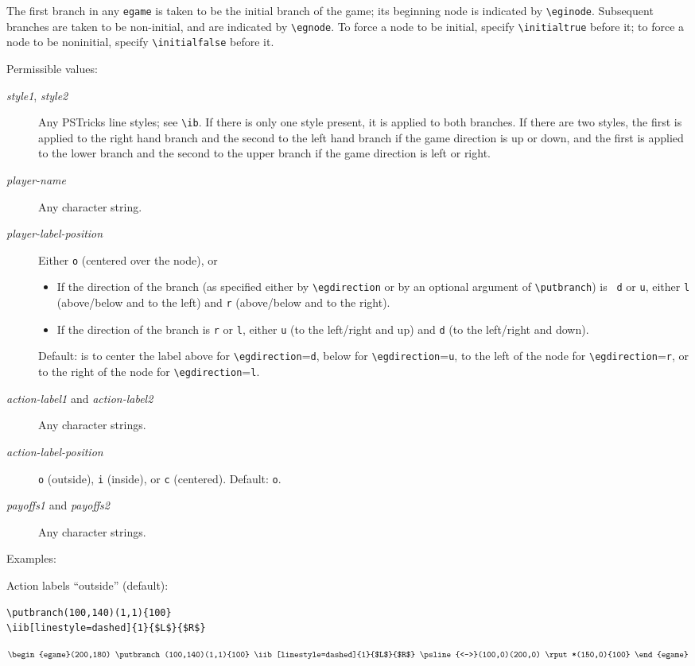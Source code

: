 \documentclass[12pt]{article}
\begin{document}
The first branch in any {\tt egame} is taken to be the initial branch of the
game; its beginning node is indicated by \verb+\eginode+.  Subsequent branches
are taken to be non-initial, and are indicated by \verb+\egnode+.  To force a
node to be initial, specify \verb+\initialtrue+ before it; to force a node to
be noninitial, specify \verb+\initialfalse+ before it.

Permissible values:
\begin{description}
\item[\emph{style1}, \emph{style2}] Any PSTricks line styles; see \verb+\ib+. 
If there is only one style present, it is applied to both branches.  If there
are two styles, the first is applied to the right hand branch and the second
to the left hand branch if the game direction is up or down, and the first is
applied to the lower branch and the second to the upper branch if the game
direction is left or right.
\item[\emph{player-name}] Any character string.
\item[\emph{player-label-position}] Either \verb+o+ (centered over the node),
or
\begin{itemize}
   \item If the direction of the branch (as specified either by
\verb+\egdirection+ or by an optional argument of \verb+\putbranch+) is {\tt
d} or {\tt u}, either {\tt l} (above/below and to the left) and {\tt r}
(above/below and to the right).
   \item If the direction of the branch is {\tt r} or {\tt l}, either {\tt u}
(to the left/right and up) and {\tt d} (to the left/right and down). 
\end{itemize}
Default: is to center the label above for \verb+\egdirection+=\verb+d+, below
for \verb+\egdirection+=\verb+u+, to the left of the node for
\verb+\egdirection+=\verb+r+, or to the right of the node for
\verb+\egdirection+=\verb+l+.
\item[\emph{action-label1} and \emph{action-label2}] Any character strings.
\item[\emph{action-label-position}] \verb+o+ (outside), \verb+i+ (inside), or
\verb+c+ (centered).  Default: \verb+o+.
\item[\emph{payoffs1} and \emph{payoffs2}] Any character strings.
\end{description}

Examples:

Action labels ``outside'' (default):
\begin{verbatim}
\putbranch(100,140)(1,1){100}
\iib[linestyle=dashed]{1}{$L$}{$R$}
\end{verbatim}
$$\begin{egame}(200,180)
\putbranch(100,140)(1,1){100}
\iib[linestyle=dashed]{1}{$L$}{$R$}
\psline{<->}(100,0)(200,0)
\rput*(150,0){100}
\end{egame}$$
\end{document}
